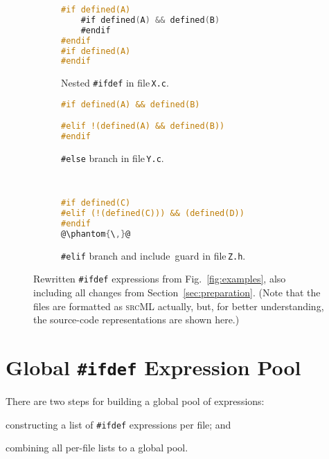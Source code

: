 \documentclass[a4paper]{scrartcl}
\newcommand\code[1]{\texttt{#1}}
\newcommand\tool[1]{\textsc{#1}}
\newcommand\ifdeff[1]{\code{\##1}\xspace}
\newcommand\ifdef[0]{{\upshape\ifdeff{ifdef}}\xspace}
\begin{document}
\begin{figure}[ht]
        \centering
        \begin{subfigure}[t]{\textwidth}
					\begin{lstlisting}[language=C]
#if defined(A)
	#if defined(A) && defined(B)
	#endif
#endif
#if defined(A)
#endif
					\end{lstlisting}
					\caption{Nested \ifdef in file\,\code{X.c}.\vspace{1em}}
					\label{fig:examples2:a}
        \end{subfigure}
        \vspace{1em}
        \begin{subfigure}[t]{\textwidth}
					\begin{lstlisting}[language=C, firstnumber=5]
#if defined(A) && defined(B)

#elif !(defined(A) && defined(B))
#endif
					\end{lstlisting}
					\caption{\ifdeff{else} branch in file\,\code{Y.c}.}
					\label{fig:examples2:b}
        \end{subfigure}
        \begin{subfigure}[t]{\textwidth}
					\begin{lstlisting}[language=C, firstnumber=8]


#if defined(C)
#elif (!(defined(C))) && (defined(D))
#endif
@\phantom{\,}@
					\end{lstlisting}
					\caption{\ifdeff{elif} branch and include~guard in file\,\code{Z.h}.}
					\label{fig:examples2:c}
        \end{subfigure}
        
        \caption{Rewritten \ifdef expressions from Fig.\ \ref{fig:examples}, also including all changes from Section~\ref{sec:preparation}.
        				{\footnotesize (Note that the files are formatted as \tool{srcML} actually, but, for better understanding, the source-code representations are shown here.)}}
        \label{fig:examples2}
\end{figure}



\section{Global \ifdef Expression Pool}
\label{sec:pool}

There are two steps for building a global pool of expressions:
\begin{inparaenum}[\itshape 1\upshape)]
\item constructing a list of \ifdef expressions per file; and
\item combining all per-file lists to a global pool.
\end{inparaenum}
\end{document}
